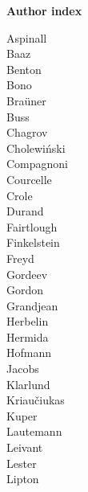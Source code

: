 \newpage
\noindent
{\Large \bf Author index}\\[.5cm]
\begin{minipage}[t]{5cm}
Aspinall	 \\[.1cm]
Baaz	 \\[.1cm]
Benton	 \\[.1cm]
Bono	 \\[.1cm]
Bra\"uner	 \\[.1cm]
Buss	 \\[.1cm]
Chagrov	 \\[.1cm]
Cholewi\'nski	 \\[.1cm]
Compagnoni	 \\[.1cm]
Courcelle	 \\[.1cm]
Crole	 \\[.1cm]
Durand	 \\[.1cm]
Fairtlough	 \\[.1cm]
Finkelstein	 \\[.1cm]
Freyd	 \\[.1cm]
Gordeev	 \\[.1cm]
Gordon	 \\[.1cm]
Grandjean	 \\[.1cm]
Herbelin	 \\[.1cm]
Hermida	 \\[.1cm]
Hofmann	 \\[.1cm]
Jacobs	 \\[.1cm]
Klarlund	 \\[.1cm]
Kriau\v ciukas	 \\[.1cm]
Kuper	 \\[.1cm]
Lautemann	 \\[.1cm]
Leivant	 \\[.1cm]
Lester	 \\[.1cm]
Lipton	 \\[.1cm]
\end{minipage}
\hfill
